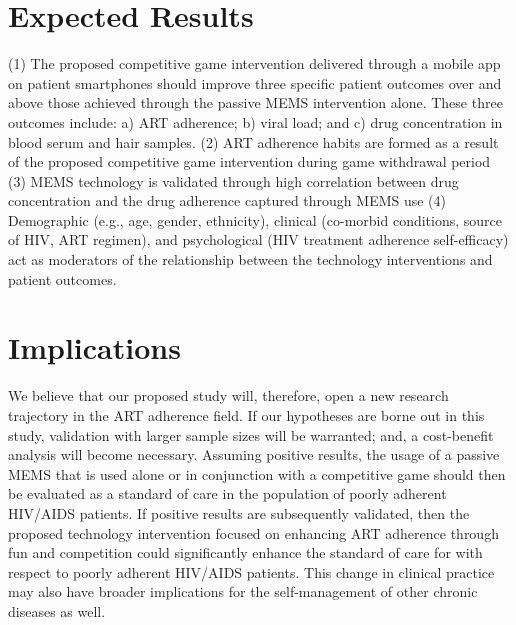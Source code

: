 \section{Expected Results}

(1) The proposed competitive game intervention delivered through a mobile app on patient smartphones should improve three specific patient outcomes over and above those achieved through the passive MEMS intervention alone. These three outcomes include: a) ART adherence; b) viral load; and c) drug concentration in blood serum and hair samples. (2) ART adherence habits are formed as a result of the proposed competitive game intervention during game withdrawal period (3) MEMS technology is validated through high correlation between drug concentration and the drug adherence captured through MEMS use (4) Demographic (e.g., age, gender, ethnicity), clinical (co-morbid conditions, source of HIV, ART regimen), and psychological (HIV treatment adherence self-efficacy) act as moderators of the relationship between the technology interventions and patient outcomes. 

\section{Implications}

We believe that our proposed study will, therefore, open a new research trajectory in the ART adherence field. If our hypotheses are borne out in this study, validation with larger sample sizes will be warranted; and, a cost-benefit analysis will become necessary. Assuming positive results, the usage of a passive MEMS that is used alone or in conjunction with a competitive game should then be evaluated as a standard of care in the population of poorly adherent HIV/AIDS patients. If positive results are subsequently validated, then the proposed technology intervention focused on enhancing ART adherence through fun and competition could significantly enhance the standard of care for with respect to poorly adherent HIV/AIDS patients. This change in clinical practice may also have broader implications for the self-management of other chronic diseases as well.\cite{kennedy2015pocket}